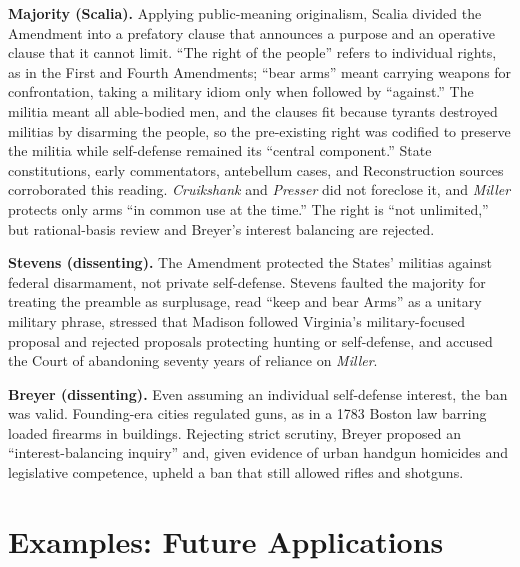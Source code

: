 \documentclass[12pt]{article}
\begin{document}
\textbf{Majority (Scalia).} Applying public-meaning originalism, Scalia divided the Amendment into a prefatory clause that announces a purpose and an operative clause that it cannot limit. ``The right of the people'' refers to individual rights, as in the First and Fourth Amendments; ``bear arms'' meant carrying weapons for confrontation, taking a military idiom only when followed by ``against.'' The militia meant all able-bodied men, and the clauses fit because tyrants destroyed militias by disarming the people, so the pre-existing right was codified to preserve the militia while self-defense remained its ``central component.'' State constitutions, early commentators, antebellum cases, and Reconstruction sources corroborated this reading. \textit{Cruikshank} and \textit{Presser} did not foreclose it, and \textit{Miller} protects only arms ``in common use at the time.'' The right is ``not unlimited,'' but rational-basis review and Breyer's interest balancing are rejected.

\textbf{Stevens (dissenting).} The Amendment protected the States' militias against federal disarmament, not private self-defense. Stevens faulted the majority for treating the preamble as surplusage, read ``keep and bear Arms'' as a unitary military phrase, stressed that Madison followed Virginia's military-focused proposal and rejected proposals protecting hunting or self-defense, and accused the Court of abandoning seventy years of reliance on \textit{Miller}.

\textbf{Breyer (dissenting).} Even assuming an individual self-defense interest, the ban was valid. Founding-era cities regulated guns, as in a 1783 Boston law barring loaded firearms in buildings. Rejecting strict scrutiny, Breyer proposed an ``interest-balancing inquiry'' and, given evidence of urban handgun homicides and legislative competence, upheld a ban that still allowed rifles and shotguns.

\section{Examples: Future Applications}
\end{document}
